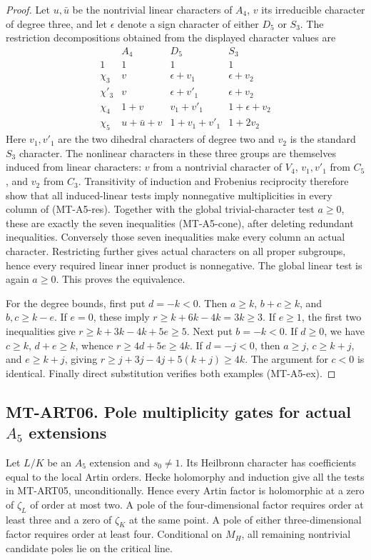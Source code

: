\documentclass[11pt,a4paper]{article}
\begin{document}
\begin{proof}
Let $u,\bar u$ be the nontrivial linear characters of $A_4$,
$v$ its irreducible character of degree three, and let $\epsilon$
denote a sign character of either $D_5$ or $S_3$. The restriction
decompositions obtained from the displayed character values are
\[
\begin{array}{c|ccc}
 & A_4 & D_5 & S_3\\\hline
1&1&1&1\\
\chi_3&v&\epsilon+v_1&\epsilon+v_2\\
\chi'_3&v&\epsilon+v'_1&\epsilon+v_2\\
\chi_4&1+v&v_1+v'_1&1+\epsilon+v_2\\
\chi_5&u+\bar u+v&1+v_1+v'_1&1+2v_2
\end{array}                                                   \tag{MT-A5-res}
\]
Here $v_1,v'_1$ are the two dihedral characters of degree two and
$v_2$ is the standard $S_3$ character. The nonlinear characters in
these three groups are themselves induced from linear characters:
$v$ from a nontrivial character of $V_4$, $v_1,v'_1$ from $C_5$,
and $v_2$ from $C_3$. Transitivity of induction and Frobenius reciprocity
therefore show that all induced-linear tests imply nonnegative
multiplicities in every column of (MT-A5-res). Together with the
global trivial-character test $a\ge0$, these are exactly the seven
inequalities (MT-A5-cone), after deleting redundant inequalities.
Conversely those seven inequalities make every column an actual
character. Restricting further gives actual characters on all proper
subgroups, hence every required linear inner product is nonnegative.
The global linear test is again $a\ge0$. This proves the equivalence.

For the degree bounds, first put $d=-k<0$. Then $a\ge k$,
$b+c\ge k$, and $b,c\ge k-e$. If $e=0$, these imply
$r\ge k+6k-4k=3k\ge3$. If $e\ge1$, the first two inequalities give
$r\ge k+3k-4k+5e\ge5$. Next put $b=-k<0$. If $d\ge0$, we have
$c\ge k$, $d+e\ge k$, whence
$r\ge4d+5e\ge4k$. If $d=-j<0$, then
$a\ge j$, $c\ge k+j$, and $e\ge k+j$, giving
$r\ge j+3j-4j+5(k+j)\ge4k$. The argument for $c<0$ is identical.
Finally direct substitution verifies both examples (MT-A5-ex).
\end{proof}

\subsection*{MT-ART06. Pole multiplicity gates for actual \texorpdfstring{$A_5$}{A5} extensions}
Let $L/K$ be an $A_5$ extension and $s_0\ne1$. Its Heilbronn character
has coefficients equal to the local Artin orders. Hecke holomorphy and
induction give all the tests in MT-ART05, unconditionally. Hence every
Artin factor is holomorphic at a zero of $\zeta_L$ of order at most two.
A pole of the four-dimensional factor requires order at least three
and a zero of $\zeta_K$ at the same point. A pole of either
three-dimensional factor requires order at least four. Conditional on
$M_H$, all remaining nontrivial candidate poles lie on the critical line.
\end{document}

